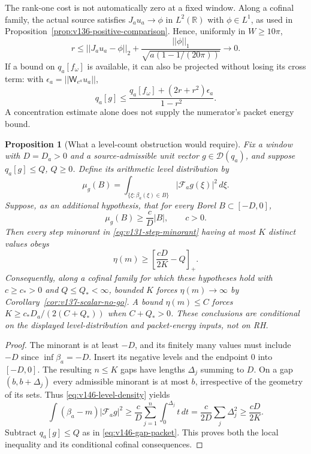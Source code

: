\documentclass[11pt]{article}
\def\norm#1{||#1||}%
\newtheorem{proposition}[theorem]{Proposition}
\theoremstyle{remark}
\newcommand{\norm}[1]{\left\lVert #1\right\rVert}
\begin{document}
The rank-one cost is not automatically zero at a fixed window. Along
a cofinal family, the actual source satisfies $J_au_a\to\phi$ in
$L^2(\mathbb R)$ with $\phi\in L^1$, as used in
Proposition~\ref{prop:v136-positive-comparison}. Hence, uniformly in
$W\ge10\pi$,
\[
 r\le\norm{J_au_a-\phi}_2
       +\frac{\norm\phi_1}{\sqrt{a(1-1/(20\pi))}}\longrightarrow0.
\]
If a bound on $q_a[f_\omega]$ is available, it can also be projected
without losing its cross term: with
$\epsilon_a=\norm{\mathsf W_{e^a}u_a}$,
\[
 q_a[g]\le\frac{q_a[f_\omega]+(2r+r^2)\epsilon_a}{1-r^2}.
\]
A concentration estimate alone does not supply the numerator's packet
energy bound.

\begin{proposition}[What a level-count obstruction would require]
\label{prop:v146-level-complexity}
Fix a window with $D=D_a>0$ and a source-admissible unit vector
$g\in\mathcal D(q_a)$, and suppose $q_a[g]\le Q$, $Q\ge0$.
Define its arithmetic level distribution by
\[
 \mu_g(B)=\int_{\{\xi:\beta_a(\xi)\in B\}}
                      |\mathcal F_ag(\xi)|^2\,d\xi.
\]
Suppose, as an additional hypothesis, that for every Borel
$B\subset[-D,0]$,
\begin{equation}\label{eq:v146-level-density}
 \mu_g(B)\ge\frac{c}{D}|B|,\qquad c>0.
\end{equation}
Then every step minorant in \eqref{eq:v131-step-minorant} having at
most $K$ distinct values obeys
\begin{equation}\label{eq:v146-level-lower}
 \eta(m)\ge\left[\frac{cD}{2K}-Q\right]_+.
\end{equation}
Consequently, along a cofinal family for which these hypotheses hold
with $c\ge c_*>0$ and $Q\le Q_*<\infty$, bounded $K$ forces
$\eta(m)\to\infty$ by Corollary~\ref{cor:v137-scalar-no-go}.
A bound $\eta(m)\le C$ forces
$K\ge c_*D_a/(2(C+Q_*))$ when $C+Q_*>0$.
These conclusions are conditional on the displayed level-distribution
and packet-energy inputs, not on RH.
\end{proposition}
\begin{proof}
The minorant is at least $-D$, and its finitely many values must include
$-D$ since $\inf\beta_a=-D$. Insert its negative levels and the endpoint
$0$ into $[-D,0]$. The resulting $n\le K$ gaps have lengths
$\Delta_j$ summing to $D$. On a gap $(b,b+\Delta_j)$ every admissible
minorant is at most $b$, irrespective of the geometry of its sets.
Thus \eqref{eq:v146-level-density} yields
\[
 \int(\beta_a-m)|\mathcal F_ag|^2
 \ge\frac{c}{D}\sum_{j=1}^n\int_0^{\Delta_j}t\,dt
 =\frac{c}{2D}\sum_j\Delta_j^2\ge\frac{cD}{2K}.
\]
Subtract $q_a[g]\le Q$ as in \eqref{eq:v146-gap-packet}. This proves
both the local inequality and its conditional cofinal consequences.
\end{proof}
\end{document}
